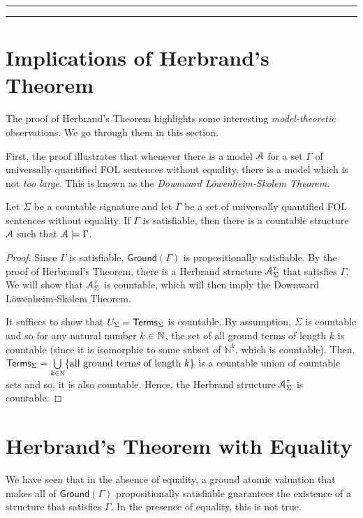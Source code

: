 \documentclass[11pt,usenames, dvipsnames]{article}
\begin{document}
\vspace{5truemm}
\hrule
\hrule

\section*{\large \centering Implications of Herbrand's Theorem}
\noindent

The proof of Herbrand's Theorem highlights some interesting \emph{model-theoretic} observations. We go through them in this section.

First, the proof illustrates that whenever there is a model $\struct$ for a set $\Gamma$ of universally quantified FOL sentences without equality, there is a model which is not \emph{too large}. This is known as the \emph{Downward Löwenheim-Skolem Theorem}.

\begin{theorem}
  Let $\Sigma$ be a countable signature and let $\Gamma$ be a set of universally quantified FOL sentences without equality. If $\Gamma$ is satisfiable, then there is a countable structure $\struct$ such that $\struct \models \Gamma$.
\end{theorem}

\begin{proof}
  Since $\Gamma$ is satisfiable, $\mathsf{Ground}(\Gamma)$ is propositionally satisfiable. By the proof of Herbrand's Theorem, there is a Herbrand structure $\struct_\Sigma^\tau$ that satisfies $\Gamma$. We will show that $\struct_\Sigma^\tau$ is countable, which will then imply the Downward Löwenheim-Skolem Theorem.

  It suffices to show that $U_\Sigma = \mathsf{Terms}_\Sigma$ is countable. By assumption, $\Sigma$ is countable and so for any natural number $k \in \mathbb{N}$, the set of all ground terms of length $k$ is countable (since it is isomorphic to some subset of $\mathbb{N}^k$, which is countable). Then, $\mathsf{Terms}_\Sigma = \bigcup\limits_{k \in \mathbb{N}}\{\text{all ground terms of length } k\}$ is a countable union of countable sets and so, it is also countable. Hence, the Herbrand structure $\struct_\Sigma^\tau$ is countable.
\end{proof}

\section*{\large \centering Herbrand's Theorem with Equality}
\noindent

We have seen that in the absence of equality, a ground atomic valuation that makes all of $\mathsf{Ground}(\Gamma)$ propositionally satisfiable guarantees the existence of a structure that satisfies $\Gamma$. In the presence of equality, this is not true.
\end{document}
